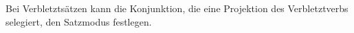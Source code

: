 \noindent
Bei Verbletztsätzen kann die Konjunktion, die eine Projektion des Verbletztverbs selegiert, den
Satzmodus festlegen. 

